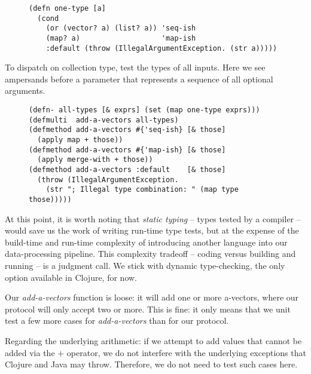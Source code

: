 \documentclass[11pt]{article}
\begin{document}
\begin{figure}[H]
\label{one-type}
\begin{verbatim}
(defn one-type [a]
  (cond
    (or (vector? a) (list? a)) 'seq-ish
    (map? a)                   'map-ish
    :default (throw (IllegalArgumentException. (str a)))))
\end{verbatim}
\end{figure}

To dispatch on collection type, test the types of all inputs. Here we
see ampersands before a parameter that represents a sequence of all
optional arguments.

\begin{figure}[H]
\label{add-a-vectors}
\begin{verbatim}
(defn- all-types [& exprs] (set (map one-type exprs)))
(defmulti  add-a-vectors all-types)
(defmethod add-a-vectors #{'seq-ish} [& those]
  (apply map + those))
(defmethod add-a-vectors #{'map-ish} [& those]
  (apply merge-with + those))
(defmethod add-a-vectors :default    [& those]
  (throw (IllegalArgumentException.
    (str "; Illegal type combination: " (map type those)))))
\end{verbatim}
\end{figure}

At this point, it is worth noting that \emph{static typing} -- types
tested by a compiler -- would save us the work of writing run-time
type tests, but at the expense of the build-time and run-time
complexity of introducing another language into our data-processing
pipeline. This complexity tradeoff -- coding versus building and
running -- is a judgment call.  We stick with dynamic type-checking,
the only option available in Clojure, for now.

Our \emph{add-a-vectors} function is loose: it will add one or more
a-vectors, where our protocol will only accept two or more. This is
fine: it only means that we unit test a few more cases for
\emph{add-a-vectors} than for our protocol.

Regarding the underlying arithmetic: if we attempt to add values that
cannot be added via the $+$ operator, we do not interfere with the
underlying exceptions that Clojure and Java may throw. Therefore, we
do not need to test such cases here.
\end{document}
